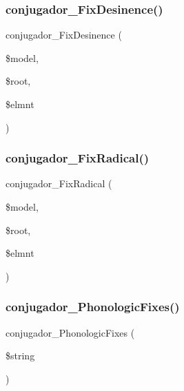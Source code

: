 \subsubsection{\texorpdfstring{conjugador\+\_\+\+Fix\+Desinence()}{conjugador\_FixDesinence()}}
{\footnotesize\ttfamily conjugador\+\_\+\+Fix\+Desinence (\begin{DoxyParamCaption}\item[{}]{\$model,  }\item[{}]{\$root,  }\item[{}]{\$elmnt }\end{DoxyParamCaption})}

\hypertarget{php_2conjugador__lib_8inc_a76b9b56f90098bda21fa8043ae7318ae}{}\label{php_2conjugador__lib_8inc_a76b9b56f90098bda21fa8043ae7318ae} 
\subsubsection{\texorpdfstring{conjugador\+\_\+\+Fix\+Radical()}{conjugador\_FixRadical()}}
{\footnotesize\ttfamily conjugador\+\_\+\+Fix\+Radical (\begin{DoxyParamCaption}\item[{}]{\$model,  }\item[{}]{\$root,  }\item[{}]{\$elmnt }\end{DoxyParamCaption})}

\hypertarget{php_2conjugador__lib_8inc_a672ae0386cba05339c0708b743535c7a}{}\label{php_2conjugador__lib_8inc_a672ae0386cba05339c0708b743535c7a} 
\subsubsection{\texorpdfstring{conjugador\+\_\+\+Phonologic\+Fixes()}{conjugador\_PhonologicFixes()}}
{\footnotesize\ttfamily conjugador\+\_\+\+Phonologic\+Fixes (\begin{DoxyParamCaption}\item[{}]{\$string }\end{DoxyParamCaption})}

